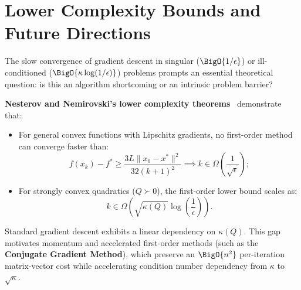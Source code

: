 \FloatBarrier
\section{Lower Complexity Bounds and Future Directions}
\label{sec:lower-complexity-bounds}

The slow convergence of gradient descent in singular ($\BigO{1/\epsilon}$) or ill-conditioned ($\BigO{\kappa \log(1/\epsilon)}$) problems prompts an essential theoretical question: is this an algorithm shortcoming or an intrinsic problem barrier?

\textbf{Nesterov and Nemirovski's lower complexity theorems}~\cite{nesterov2004introductory} demonstrate that:
\begin{itemize}
    \item For general convex functions with Lipschitz gradients, no first-order method can converge faster than:
    \begin{equation}
        f(x_k) - f^* \ge \frac{3 L \|x_0 - x^*\|^2}{32 (k + 1)^2} \implies k \in \Omega\left(\frac{1}{\sqrt{\epsilon}}\right);
    \end{equation}
    \item For strongly convex quadratics ($Q \succ 0$), the first-order lower bound scales as:
    \begin{equation}
        k \in \Omega\left(\sqrt{\kappa(Q)} \log\left(\frac{1}{\epsilon}\right)\right).
    \end{equation}
\end{itemize}
Standard gradient descent exhibits a linear dependency on $\kappa(Q)$. This gap motivates momentum and accelerated first-order methods (such as the \textbf{Conjugate Gradient Method}), which preserve an $\BigO{n^2}$ per-iteration matrix-vector cost while accelerating condition number dependency from $\kappa$ to $\sqrt{\kappa}$.
